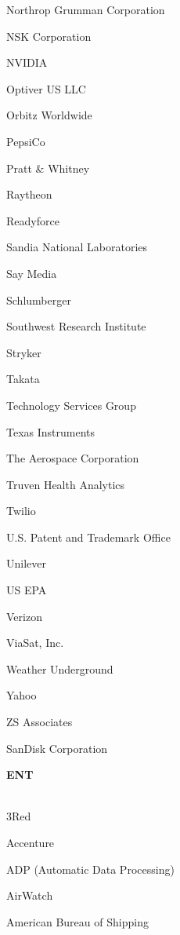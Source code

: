 \documentclass[twoside]{article}
\begin{document}
\begin{center}
\begin{multicols}{5}
\begin{FlushLeft}
\begin{compactitem}
\item Northrop Grumman Corporation
\item NSK Corporation
\item NVIDIA
\item Optiver US LLC
\item Orbitz Worldwide
\item PepsiCo
\item Pratt \& Whitney
\item Raytheon
\item Readyforce
\item Sandia National Laboratories
\item Say Media
\item Schlumberger
\item Southwest Research Institute
\item Stryker
\item Takata
\item Technology Services Group
\item Texas Instruments
\item The Aerospace Corporation
\item Truven Health Analytics
\item Twilio
\item U.S. Patent and Trademark Office
\item Unilever
\item US EPA
\item Verizon
\item ViaSat, Inc.
\item Weather Underground
\item Yahoo
\item ZS Associates
\item SanDisk Corporation
\end{compactitem}
        \end{FlushLeft}
        \vspace{1em}
        {\fontsize{14}{16}\selectfont \bf ENT}\\
        \vspace{-1em}
        ~\hrulefill~
        \vspace{-.9em}
        \begin{FlushLeft}
        \begin{compactitem}
        \item 3Red
\item Accenture
\item ADP (Automatic Data Processing)
\item AirWatch
\item American Bureau of Shipping

\end{compactitem}
\end{FlushLeft}
\end{multicols}
\end{center}
\end{document}

